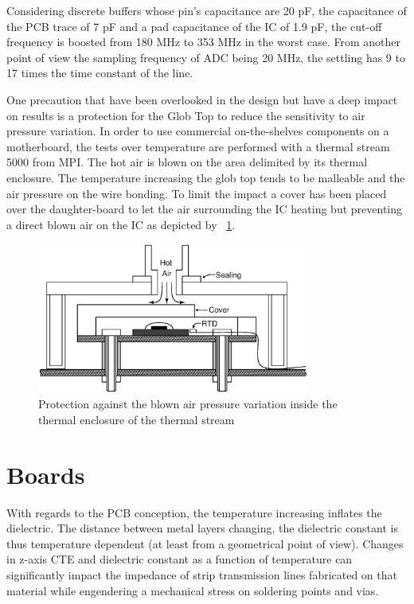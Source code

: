 Considering discrete buffers whose pin's capacitance are 20 pF, the capacitance of the PCB trace of 7 pF and a pad capacitance of the IC of 1.9 pF, the cut-off frequency is boosted from 180 MHz to 353 MHz in the worst case. From another point of view the sampling frequency of ADC being 20 MHz, the settling has 9 to 17 times the time constant of the line.

One precaution that have been overlooked in the design but have a deep impact on results is a protection for the Glob Top to reduce the sensitivity to air pressure variation. In order to use commercial on-the-shelves components on a motherboard, the tests over temperature are performed with a thermal stream 5000 from MPI\@. The hot air is blown on the area delimited by its thermal enclosure. The temperature increasing the glob top tends to be malleable and the air pressure on the wire bonding. To limit the impact a cover has been placed over the daughter-board to let the air surrounding the IC heating but preventing a direct blown air on the IC as depicted by \figurename~\ref{fig:thermalstream-air-protection}.

\begin{figure}[htp]
    \centering
    \includegraphics[width=0.8\textwidth]{Chapter5/Figs/PCB/thermal-stream-protection.ps}
    \caption{Protection against the blown air pressure variation inside the thermal enclosure of the thermal stream}
    \label{fig:thermalstream-air-protection}
\end{figure}

\section{Boards}
With regards to the PCB conception, the temperature increasing inflates the dielectric. The distance between metal layers changing, the dielectric constant is thus temperature dependent (at least from a geometrical point of view). Changes in z-axis CTE and dielectric constant as a function of temperature can significantly impact the impedance of strip transmission lines fabricated on that material while engendering a mechanical stress on soldering points and vias.


